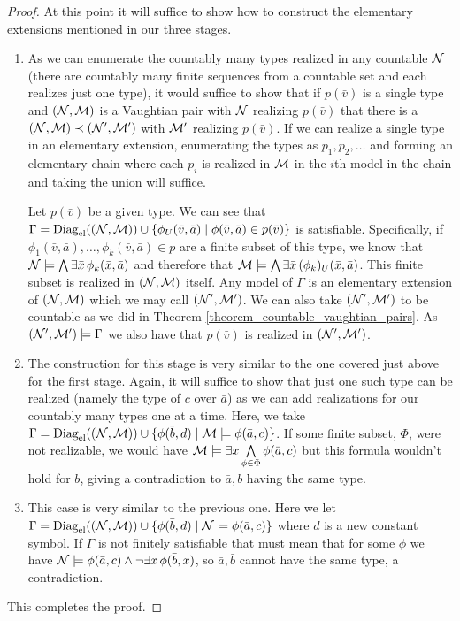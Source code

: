 \begin{proof}
At this point it will suffice to show how to construct the elementary extensions mentioned in our three stages. 

\begin{enumerate}
\item As we can enumerate the countably many types realized in any countable \(\mathcal{N}\) (there are countably many finite sequences from a countable set and each realizes just one type), it would suffice to show that if \(p(\bar{v})\) is a single type and \((\mathcal{N}, \mathcal{M})\) is a Vaughtian pair with \(\mathcal{N}\) realizing \(p(\bar{v})\) that there is a \((\mathcal{N}, \mathcal{M}) \prec (\mathcal{N}', \mathcal{M}')\) with \(\mathcal{M}'\) realizing \(p(\bar{v})\). 
If we can realize a single type in an elementary extension, enumerating the types as \(p_1, p_2, \ldots\) and forming an elementary chain where each \(p_i\) is realized in \(\mathcal{M}\) in the \(i\)th model in the chain and taking the union will suffice.

Let \(p(\bar{v})\) be a given type. 
We can see that \(\Gamma = \text{Diag}_\text{el}((\mathcal{N}, \mathcal{M})) \cup \{\phi_U(\bar{v}, \bar{a}) \mid \phi(\bar{v}, \bar{a}) \in  p(\bar{v})\}\) is satisfiable.  
Specifically, if \(\phi_1(\bar{v}, \bar{a}), \ldots, \phi_k(\bar{v}, \bar{a}) \in p\) are a finite subset of this type, we know that \(\mathcal{N} \models \bigwedge\limits \exists \bar{x}\, \phi_k(\bar{x},\bar{a})\) and therefore that \(\mathcal{M} \models \bigwedge\limits \exists \bar{x} \, (\phi_k)_U(\bar{x},\bar{a})\). 
This finite subset is realized in \((\mathcal{N}, \mathcal{M})\) itself. 
Any model of \(\Gamma\) is an elementary extension of \((\mathcal{N}, \mathcal{M})\) which we may call \((\mathcal{N}', \mathcal{M}')\).
We can also take \((\mathcal{N}', \mathcal{M}')\) to be countable as we did in Theorem \ref{theorem_countable_vaughtian_pairs}. 
As \((\mathcal{N}', \mathcal{M}') \models \Gamma\) we also have that \(p(\bar{v})\) is realized in \((\mathcal{N}', \mathcal{M}')\). 

\item The construction for this stage is very similar to the one covered just above for the first stage.
Again, it will suffice to show that just one such type can be realized (namely the type of \(c\) over \(\bar{a}\)) as we can add realizations for our countably many types one at a time. 
Here, we take \(\Gamma = \text{Diag}_\text{el}((\mathcal{N}, \mathcal{M})) \cup \{\phi(\bar{b}, d) \mid \mathcal{M} \models \phi(\bar{a}, c)\}\). 
If some finite subset, \(\Phi\), were not realizable, we would have \(\mathcal{M} \models \exists x \bigwedge\limits_{\phi \in \Phi}\phi(\bar{a}, c)\) but this formula wouldn't hold for \(\bar{b}\), giving a contradiction to \(\bar{a}, \bar{b}\) having the same type. 

\item This case is very similar to the previous one. Here we let \(\Gamma = \text{Diag}_\text{el}((\mathcal{N}, \mathcal{M})) \cup \{\phi(\bar{b}, d) \mid \mathcal{N} \models \phi(\bar{a}, c)\}\) where \(d\) is a new constant symbol.
If \(\Gamma\) is not finitely satisfiable that must mean that for some \(\phi\) we have \(\mathcal{N} \models \phi(\bar{a}, c) \land \neg \exists x \, \phi(\bar{b}, x)\), 
so \(\bar{a}, \bar{b}\) cannot have the same type, a contradiction.
\end{enumerate}
This completes the proof. 
\end{proof}

